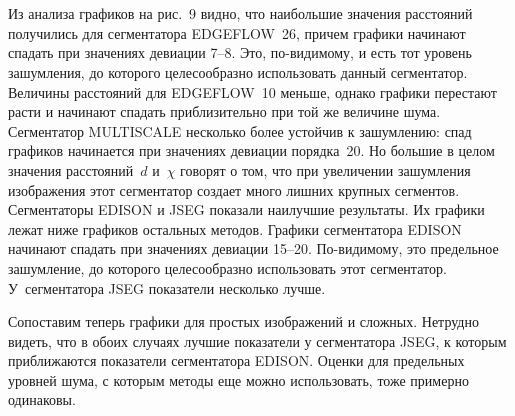 \begin{multicols}{2}
  \begin{figure*} %
  \vspace*{1pt}
\begin{center}
\mbox{%
\epsfxsize=162.93mm
}
\end{center}
\vspace*{-6pt}
  \end{figure*}
  
  \begin{figure*}[b] %
\vspace*{1pt}
\begin{center}
\mbox{%
\epsfxsize=162.93mm
}
\end{center}
\vspace*{-6pt}
  \end{figure*}
  
  Из анализа графиков на рис.~9 видно, что наибольшие значения расстояний 
получились для сегментатора {EDGEFLOW~26}, причем графики\linebreak 
начинают спадать при значениях девиации 7--8. Это,
по-видимому, и есть тот 
уровень зашумления, до которого целесообразно использовать данный 
сег\-мен\-та\-тор. Величины расстояний для \mbox{EDGEFLOW}~10 меньше, однако 
графики перестают расти и начинают спадать приблизительно при той же 
величине шума. Сегментатор {MULTISCALE} несколько более устойчив к 
зашумлению: спад графиков начинается при значениях девиации порядка~20. 
Но большие в целом значения расстояний~$d$ и~$\chi$ говорят о том, что при 
увеличении зашумления изображения этот сегментатор создает много лишних 
крупных сегментов. Сегментаторы {EDISON} и {JSEG} показали 
наилучшие результаты. Их графики лежат ниже графиков остальных методов. 
Графики сегментатора {EDISON} начинают спадать при значениях 
девиации 15--20. По-видимому, это предельное зашумление, до которого 
целесообразно использовать этот сегментатор. У~сегментатора {JSEG} 
показатели несколько лучше.
  
  Сопоставим теперь графики для простых изоб\-ра\-же\-ний и сложных. 
  Нетрудно 
видеть, что в обоих случаях лучшие показатели у сегментатора {JSEG}, к 
которым приближаются показатели сегментатора {EDISON}. Оценки для 
предельных уровней шума, с которым методы еще можно использовать, тоже 
примерно одинаковы.


\end{multicols}
